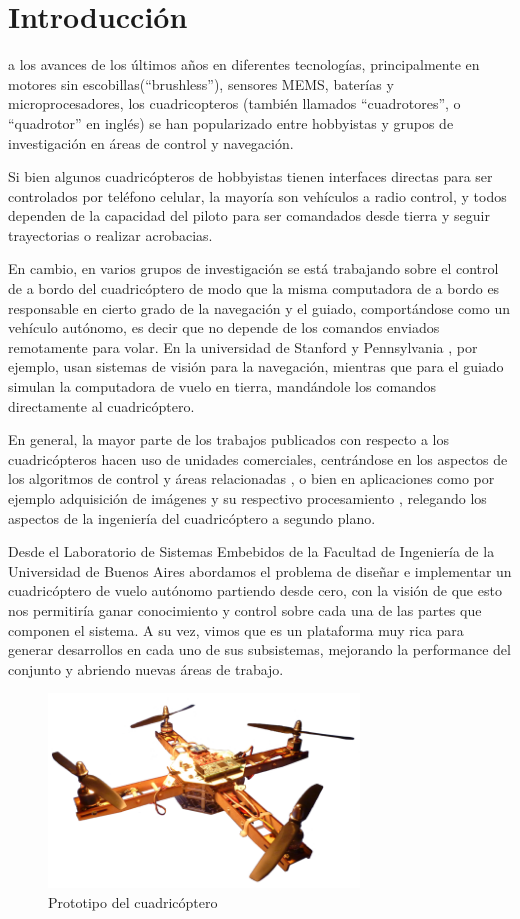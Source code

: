 \documentclass[a4paper, conference]{IEEEtran}
\begin{document}
\section{Introducción}

 a los avances de los últimos años en diferentes tecnologías, principalmente en motores sin escobillas(``brushless''), sensores MEMS, baterías y microprocesadores, los cuadricopteros (también llamados ``cuadrotores'', o ``quadrotor'' en inglés) se han popularizado entre hobbyistas y grupos de investigación en áreas de control y navegación.

Si bien algunos cuadricópteros de hobbyistas \cite{parrot} tienen interfaces directas para ser controlados por teléfono celular, la mayoría son vehículos a radio control, y todos dependen de la capacidad del piloto para ser comandados desde tierra y seguir trayectorias o realizar acrobacias. 

En cambio, en varios grupos de investigación se está trabajando sobre el control de a bordo del cuadricóptero de modo que la misma computadora de a bordo es responsable en cierto grado de la navegación y el guiado, comportándose como un vehículo autónomo, es decir que no depende de los comandos enviados remotamente para volar. En la universidad de Stanford \cite{starmac} y Pennsylvania \cite{grasp}, por ejemplo, usan sistemas de visión para la navegación, mientras que para el guiado simulan la computadora de vuelo en tierra, mandándole los comandos directamente al cuadricóptero.

En general, la mayor parte de los trabajos publicados con respecto a los cuadricópteros hacen uso de unidades comerciales, centrándose en los aspectos de los algoritmos de control y áreas relacionadas \cite{starmac} \cite{grasp}, o bien en aplicaciones como por ejemplo adquisición de imágenes y su respectivo procesamiento \cite{grasp}, relegando los aspectos de la ingeniería del cuadricóptero a segundo plano. 

Desde el Laboratorio de Sistemas Embebidos de la Facultad de Ingeniería de la Universidad de Buenos Aires abordamos el problema de diseñar e implementar un cuadricóptero de vuelo autónomo partiendo desde cero, con la visión de que esto nos permitiría ganar conocimiento y control sobre cada una de las partes que componen el sistema. A su vez, vimos que es un plataforma muy rica para generar desarrollos en cada uno de sus subsistemas, mejorando la performance del conjunto y abriendo nuevas áreas de trabajo.

\begin{figure}[!t]
\centering
\includegraphics[width=3.25in]{foto_quad.png}
\caption{Prototipo del cuadricóptero}
\label{ref:quadfoto}
\end{figure}
\end{document}
